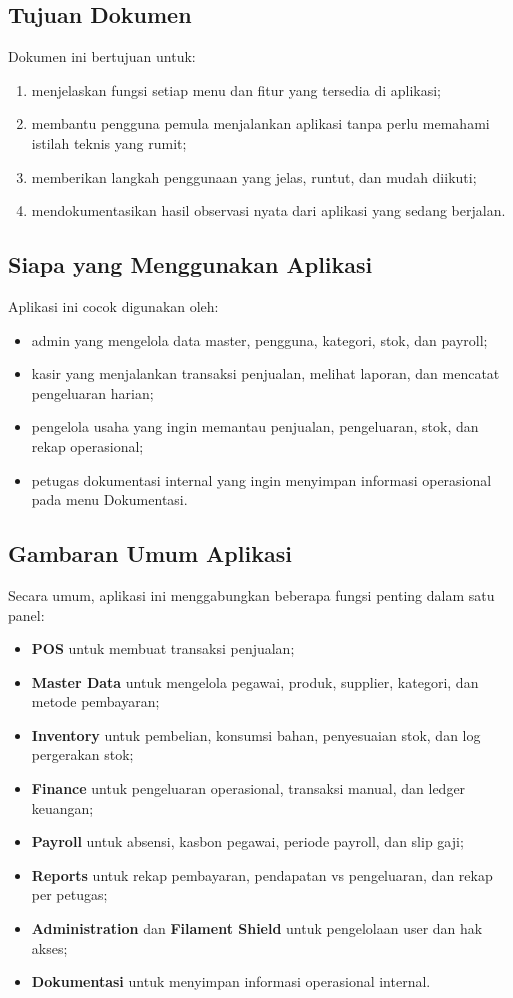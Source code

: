 \documentclass[12pt,a4paper]{article}
\begin{document}
\subsection{Tujuan Dokumen}
Dokumen ini bertujuan untuk:
\begin{enumerate}
    \item menjelaskan fungsi setiap menu dan fitur yang tersedia di aplikasi;
    \item membantu pengguna pemula menjalankan aplikasi tanpa perlu memahami istilah teknis yang rumit;
    \item memberikan langkah penggunaan yang jelas, runtut, dan mudah diikuti;
    \item mendokumentasikan hasil observasi nyata dari aplikasi yang sedang berjalan.
\end{enumerate}

\subsection{Siapa yang Menggunakan Aplikasi}
Aplikasi ini cocok digunakan oleh:
\begin{itemize}
    \item admin yang mengelola data master, pengguna, kategori, stok, dan payroll;
    \item kasir yang menjalankan transaksi penjualan, melihat laporan, dan mencatat pengeluaran harian;
    \item pengelola usaha yang ingin memantau penjualan, pengeluaran, stok, dan rekap operasional;
    \item petugas dokumentasi internal yang ingin menyimpan informasi operasional pada menu Dokumentasi.
\end{itemize}

\subsection{Gambaran Umum Aplikasi}
Secara umum, aplikasi ini menggabungkan beberapa fungsi penting dalam satu panel:
\begin{itemize}
    \item \textbf{POS} untuk membuat transaksi penjualan;
    \item \textbf{Master Data} untuk mengelola pegawai, produk, supplier, kategori, dan metode pembayaran;
    \item \textbf{Inventory} untuk pembelian, konsumsi bahan, penyesuaian stok, dan log pergerakan stok;
    \item \textbf{Finance} untuk pengeluaran operasional, transaksi manual, dan ledger keuangan;
    \item \textbf{Payroll} untuk absensi, kasbon pegawai, periode payroll, dan slip gaji;
    \item \textbf{Reports} untuk rekap pembayaran, pendapatan vs pengeluaran, dan rekap per petugas;
    \item \textbf{Administration} dan \textbf{Filament Shield} untuk pengelolaan user dan hak akses;
    \item \textbf{Dokumentasi} untuk menyimpan informasi operasional internal.
\end{itemize}
\end{document}
